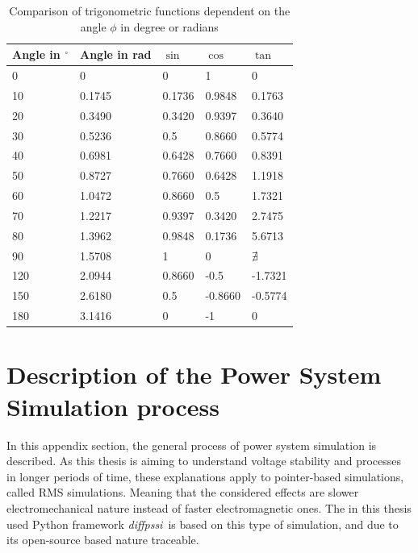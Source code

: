 \begin{table}[H]
    \centering
    \small
    \caption{Comparison of trigonometric functions dependent on the angle $\phi$ in degree or radians}
    \vspace*{12pt}
    \begin{tabularx}{\linewidth}{XXXXX}
        \textbf{Angle in $^\circ$} & \textbf{Angle in rad} & \textbf{$\sin$} & \textbf{$\cos$} & \textbf{$\tan$} \\ \toprule
        0   & 0         & 0         & 1         & 0 \\
        10  & 0.1745    & 0.1736    & 0.9848    & 0.1763 \\
        20  & 0.3490    & 0.3420    & 0.9397    & 0.3640 \\
        30  & 0.5236    & 0.5       & 0.8660    & 0.5774 \\
        40  & 0.6981    & 0.6428    & 0.7660    & 0.8391 \\
        50  & 0.8727    & 0.7660    & 0.6428    & 1.1918 \\ 
        60  & 1.0472    & 0.8660    & 0.5       & 1.7321 \\
        70  & 1.2217    & 0.9397    & 0.3420    & 2.7475 \\
        80  & 1.3962    & 0.9848    & 0.1736    & 5.6713 \\
        90  & 1.5708    & 1         & 0         & $\nexists$ \\
        120 & 2.0944    & 0.8660    & -0.5      & -1.7321 \\
        150 & 2.6180    & 0.5       & -0.8660   & -0.5774 \\
        180 & 3.1416    & 0         & -1        & 0 \\
        \bottomrule
    \end{tabularx}
\end{table}

\section{Description of the Power System Simulation process}
\label{app:power-system-modeling}

In this appendix section, the general process of power system simulation is described. As this thesis is aiming to understand voltage stability and processes in longer periods of time, these explanations apply to pointer-based simulations, called RMS simulations. Meaning that the considered effects are slower electromechanical nature instead of faster electromagnetic ones. The in this thesis used Python framework \glqq \textit{diffpssi}\grqq~is based on this type of simulation, and due to its open-source based nature traceable.

